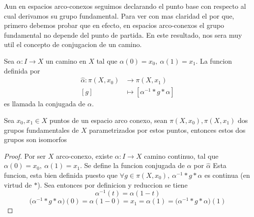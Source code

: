 {Aun en espacios arco-conexos seguimos declarando el punto base con
respecto al cual derivamos su grupo fundamental. Para ver con mas
claridad el por que, primero debemos probar que en efecto, en espacios
arco-conexos el grupo fundamental no depende del punto de partida. En
este resultado, nos sera muy util el concepto de conjugacion de un
camino.
\begin{definicion} \label{def:conjugada}
  Sea \(\alpha : I \to X\) un camino en \(X\) tal que \(\alpha (0) =
  x_0,\ \alpha(1) = x_1\). La funcion definida por
  \begin{align*}
    \hat \alpha : \pi (X, x_0) &\longrightarrow \pi (X, x_1) \\
    [g] &\longmapsto [ \alpha^{-1} * g * \alpha ]
  \end{align*}
  es llamada la conjugada de \(\alpha\).
\end{definicion}
\begin{teorema} \label{not:alpha-hat}
  Sea \(x_0 , x_1 \in X\) puntos de un espacio arco conexo, sean \(\pi
  (X, x_0), \pi (X, x_1)\) dos grupos fundamentales de \(X\)
  parametrizados por estos puntos, entonces estos dos grupos son isomorfos
\end{teorema}
\begin{proof}
  Por ser \(X\) arco-conexo, existe \(\alpha : I \to X\) camino
  continuo, tal que \(\alpha (0) = x_0,\ \alpha (1) = x_1\). Se define
  la funcion conjugada de \(\alpha\) por \(\hat \alpha\)
  Esta funcion, esta bien definida puesto que \(\forall g \in \pi (X,
  x_0),\ \alpha^{-1} * g * \alpha \) es continua (en virtud de \(*\)).
  Sea entonces por definicion y reduccion se tiene
  \[ \alpha^{-1} (t) = \alpha (1 - t)\]
  \[\big(\alpha^{-1} * g * \alpha \big) (0) = \alpha (1 - 0) = x_1 = \alpha (1) =
    \big(\alpha^{-1} * g * \alpha \big) (1)\]


\end{proof}}
